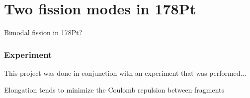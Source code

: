 \chapter{Two fission modes in 178Pt}

\maketitle
Bimodal fission in 178Pt?

\subsection{Experiment}
This project was done in conjunction with an experiment that was performed...

Elongation tends to minimize the Coulomb repulsion between fragments